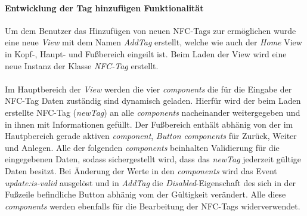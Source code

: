 \documentclass[10pt, a4paper]{article}
\begin{document}
\paragraph*{Entwicklung der Tag hinzufügen Funktionalität}
Um dem Benutzer das Hinzufügen von neuen NFC-Tags zur ermöglichen wurde eine neue \textit{View} mit dem Namen \textit{AddTag} erstellt, welche wie auch
der \textit{Home} View in Kopf-, Haupt- und Fußbereich eingeilt ist. Beim Laden der View wird eine neue Instanz der Klasse \textit{NFC-Tag} erstellt.
\\~\\
Im Hauptbereich der \textit{View} werden die vier \textit{components} die für die Eingabe der NFC-Tag Daten zuständig sind dynamisch geladen.
Hierfür wird der beim Laden erstellte NFC-Tag (\textit{newTag}) an alle \textit{components} nacheinander weitergegeben und in ihnen mit Informationen gefüllt.
Der Fußbereich enthält abhänig von der im Hautpbereich gerade aktiven \textit{component}, \textit{Button components} für \glqq Zurück\grqq{}, \glqq Weiter\grqq{} und
\glqq Anlegen\grqq.
Alle der folgenden \textit{components} beinhalten Validierung für die eingegebenen Daten, sodass sichergestellt wird, dass das \textit{newTag} jederzeit gültige
Daten besitzt. Bei Änderung der Werte in den \textit{components} wird das Event \textit{update:is-valid} ausgelöst und in \textit{AddTag} die
\textit{Disabled}-Eigenschaft des sich in der Fußzeile befindliche Button abhänig vom der Gültigkeit verändert.
Alle diese \textit{components} werden ebenfalls für die Bearbeitung der NFC-Tags widerverwendet.
\\~\\
\end{document}
